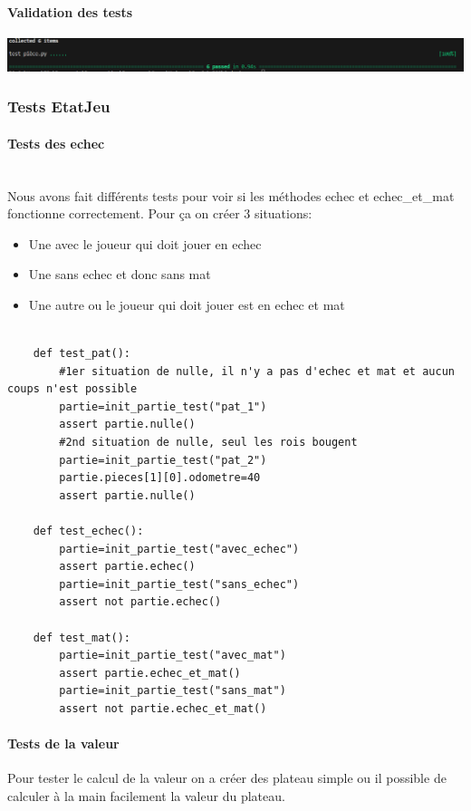 \documentclass{article}
\begin{document}
\paragraph{Validation des tests}
\begin{center}
    \includegraphics{pytest_piece.png}
\end{center}
\subsubsection{Tests EtatJeu}
\paragraph{Tests des echec}
\\
Nous avons fait différents tests pour voir si les méthodes echec et echec\_et\_mat fonctionne correctement. Pour ça on créer 3 situations:
\begin{itemize}
    \item Une avec le joueur qui doit jouer en echec
    \item Une sans echec et donc sans mat
    \item Une autre ou le joueur qui doit jouer est en echec et mat
\end{itemize}
\begin{verbatim}

    def test_pat():
        #1er situation de nulle, il n'y a pas d'echec et mat et aucun coups n'est possible
        partie=init_partie_test("pat_1")
        assert partie.nulle()
        #2nd situation de nulle, seul les rois bougent
        partie=init_partie_test("pat_2")
        partie.pieces[1][0].odometre=40
        assert partie.nulle()
        
    def test_echec():
        partie=init_partie_test("avec_echec")
        assert partie.echec()
        partie=init_partie_test("sans_echec")
        assert not partie.echec()
    
    def test_mat():
        partie=init_partie_test("avec_mat")
        assert partie.echec_et_mat()
        partie=init_partie_test("sans_mat")
        assert not partie.echec_et_mat()

\end{verbatim}

\paragraph{Tests de la valeur} 
Pour tester le calcul de la valeur on a créer des plateau simple ou il possible de calculer à la main facilement la valeur du plateau.
\end{document}

